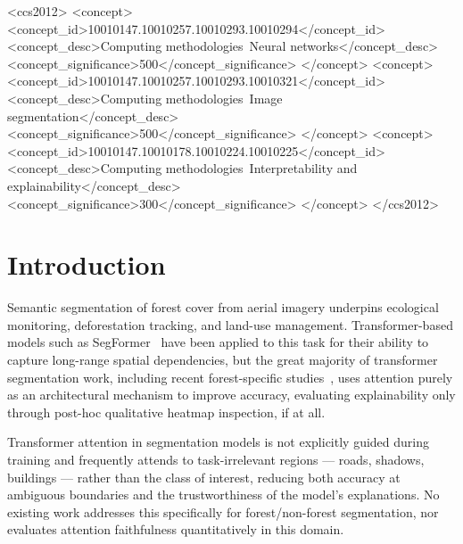 \documentclass[sigconf,review]{acmart}
\begin{document}
\begin{CCSXML}
<ccs2012>
   <concept>
       <concept_id>10010147.10010257.10010293.10010294</concept_id>
       <concept_desc>Computing methodologies~Neural networks</concept_desc>
       <concept_significance>500</concept_significance>
   </concept>
   <concept>
       <concept_id>10010147.10010257.10010293.10010321</concept_id>
       <concept_desc>Computing methodologies~Image segmentation</concept_desc>
       <concept_significance>500</concept_significance>
   </concept>
   <concept>
       <concept_id>10010147.10010178.10010224.10010225</concept_id>
       <concept_desc>Computing methodologies~Interpretability and explainability</concept_desc>
       <concept_significance>300</concept_significance>
   </concept>
</ccs2012>
\end{CCSXML}



\maketitle

\section{Introduction}

Semantic segmentation of forest cover from aerial imagery underpins
ecological monitoring, deforestation tracking, and land-use management.
Transformer-based models such as SegFormer~\cite{xie2021segformer} have been
applied to this task for their ability to capture long-range spatial
dependencies, but the great majority of transformer segmentation work,
including recent forest-specific studies~\cite{foresanext2026,ppliteseg2026,attunet2022deforestation},
uses attention purely as an architectural mechanism to improve accuracy,
evaluating explainability only through post-hoc qualitative heatmap
inspection, if at all.

Transformer attention in segmentation models is not explicitly guided
during training and frequently attends to task-irrelevant regions --- roads,
shadows, buildings --- rather than the class of interest, reducing both
accuracy at ambiguous boundaries and the trustworthiness of the model's
explanations. No existing work addresses this specifically for
forest/non-forest segmentation, nor evaluates attention faithfulness
quantitatively in this domain.
\end{document}
